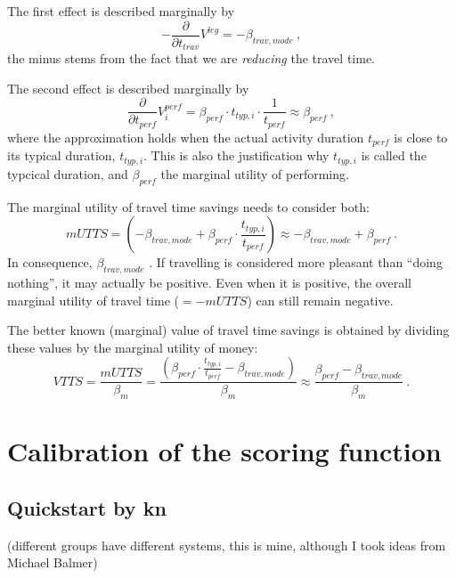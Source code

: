 The first effect is described marginally by
\[
- \frac{\partial}{\partial t_{trav}} V^{leg} = - \beta_{trav,mode} \ ,
\]
the minus stems from the fact that we are \emph{reducing} the travel time.

The second effect is described marginally by
\[
\frac{\partial}{\partial t_{perf}} V^{perf}_i
%
= \beta_{perf} \cdot t_{typ,i} \cdot \frac{1}{t_{perf}}
%
\approx \beta_{perf} \ ,
\]
where the approximation holds when the actual activity duration $t_{perf}$ is close to its typical duration, $t_{typ,i}$.  This is also the justification why $t_{typ,i}$ is called the typcical duration, and $\beta_{perf}$ the marginal utility of performing.

The marginal utility of travel time savings needs to consider both:
\[
mUTTS 
%
= \left( - \beta_{trav,mode} + \beta_{perf} \cdot \frac{t_{typ,i}}{t_{perf}} \right)
%
\approx - \beta_{trav,mode} + \beta_{perf} \ .
\]
In consequence, $\beta_{trav,mode}$ .  If travelling is considered more pleasant than ``doing nothing'', it may actually be positive.  Even when it is positive, the overall marginal utility of travel time ($= -mUTTS$) can still remain negative.

The better known (marginal) value of travel time savings is obtained by dividing these values by the marginal utility of money:
\[
VTTS = \frac{mUTTS}{\beta_m} 
%
= \frac{\left( \beta_{perf} \cdot \frac{t_{typ,i}}{t_{perf}} - \beta_{trav,mode} \right)}{\beta_m}
%
\approx \frac{\beta_{perf} - \beta_{trav,mode}}{\beta_m} \ .
\]



\section{Calibration of the scoring function}

\subsection{Quickstart by kn}
\label{sec:quickstart-kn}

(different groups have different systems, this is mine, although I took ideas from Michael Balmer)


